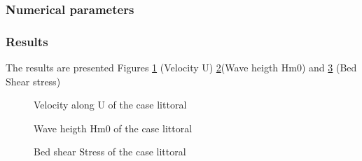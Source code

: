 %
%
\subsubsection{Numerical parameters}
%

%
%
\subsubsection{Results}
%
The results are presented Figures \ref{resultsT2D} (Velocity U) \ref{resultsTOM}(Wave heigth Hm0) and  \ref{resultsSIS} (Bed Shear stress)
\begin{figure} [!h]
\centering
{}
 \caption{Velocity along U of the case littoral}
\label{resultsT2D}
\end{figure}
\begin{figure} [!h]
\centering
{}
 \caption{Wave heigth Hm0 of the case littoral}
\label{resultsTOM}
\end{figure}
\begin{figure} [!h]
\centering
{}
 \caption{Bed shear Stress of the case littoral}
\label{resultsSIS}
\end{figure}



